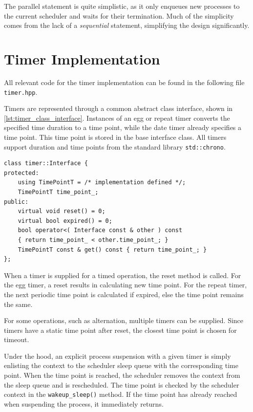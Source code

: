 The parallel statement is quite simplistic, as it only enqueues new processes to the current scheduler and waits for their termination. Much of the simplicity comes from the lack of a \textit{sequential} statement, simplifying the design significantly. 




\section{Timer Implementation}

All relevant code for the timer implementation can be found in the following file \texttt{timer.hpp}.

Timers are represented through a common abstract class interface, shown in \cref{lst:timer_class_interface}. Instances of an egg or repeat timer converts the specified time duration to a time point, while the date timer already specifies a time point. This time point is stored in the base interface class. All timers support duration and time points from the standard library \texttt{std::chrono}.

\begin{lstfloat}
\begin{lstlisting}[caption={Timer class interface.}, label={lst:timer_class_interface}, style={CustomC++}, xleftmargin={4em}]
class timer::Interface {
protected:
    using TimePointT = /* implementation defined */;
    TimePointT time_point_;
public:
    virtual void reset() = 0;
    virtual bool expired() = 0;
    bool operator<( Interface const & other ) const 
    { return time_point_ < other.time_point_; }
    TimePointT const & get() const { return time_point_; }
};
\end{lstlisting}
\end{lstfloat}

When a timer is supplied for a timed operation, the reset method is called. For the egg timer, a reset results in calculating new time point. For the repeat timer, the next periodic time point is calculated if expired, else the time point remains the same.

For some operations, such as alternation, multiple timers can be supplied. Since timers have a static time point after reset, the closest time point is chosen for timeout.

Under the hood, an explicit process suspension with a given timer is simply enlisting the context to the scheduler sleep queue with the corresponding time point. When the time point is reached, the scheduler removes the context from the sleep queue and is rescheduled. The time point is checked by the scheduler context in the \texttt{wakeup\_sleep()} method. If the time point has already reached when suspending the process, it immediately returns. 


